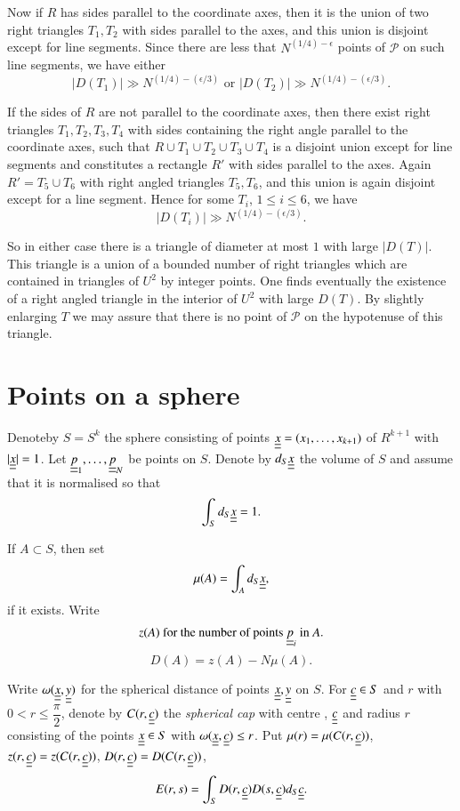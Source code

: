 Now if $R$ has sides parallel to the coordinate axes, then it is the union of two right triangles $T_{1}, T_{2}$ with sides parallel to the axes, and this union is disjoint except for line segments. Since there are less that $N^{(1/4)-\epsilon}$ points of $\mathscr{P}$ on such line segments, we have either
$$
|D(T_{1})| \gg N^{(1/4)-(\epsilon/3)} \text{ or } |D(T_{2})| \gg N^{(1/4)-(\epsilon/3)}.
$$

If the sides of $R$ are not parallel to the coordinate axes, then there exist right triangles $T_{1}, T_{2}, T_{3}, T_{4}$ with sides containing the right angle parallel to the coordinate axes, such that $R \cup T_{1} \cup T_{2} \cup T_{3} \cup T_{4}$ is a disjoint union except for line segments and constitutes a rectangle $R'$ with sides parallel to the axes. Again $R' = T_{5} \cup T_{6}$ with right angled triangles $T_{5}, T_{6}$, and this union is again disjoint except for a line segment. Hence for some $T_{i}$, $1 \leq i \leq 6$, we have
$$
|D(T_{i})| \gg N^{(1/4)-(\epsilon/3)}.
$$

So in either case there is a triangle of diameter at most $1$ with large $|D(T)|$. This triangle is a union of a bounded number of right triangles which are contained in triangles of $U^{2}$ by integer points. One finds eventually the existence of a right angled triangle in the interior of $U^{2}$ with large $D(T)$. By slightly enlarging $T$ we may assure that there is no point of $\mathscr{P}$ on the hypotenuse of this triangle.

\section{Points on a sphere}\label{chap2:sec10}

Denote\pageoriginale by $S = S^{k}$ the sphere consisting of points $\underline{\underline{x}} = (x_{1}, \ldots, x_{k+1})$ of $R^{k+1}$ with $|\underline{\underline{x}}| = 1$. Let $\underline{\underline{p}}_{1}, \ldots, \underline{\underline{p}}_{N}$ be points on $S$. Denote by $d_{S} \underline{\underline{x}}$ the volume of $S$ and assume that it is normalised so that
$$
\int_{S} d_{S} \underline{\underline{x}} = 1.
$$

If $A \subset S$, then set
$$
\mu(A) = \int_{A} d_{S} \underline{\underline{x}},
$$
if it exists. Write
$$
z(A) \text{ for the number of points } \underline{\underline{p}}_{i} \text{ in } A.
$$
$$
D(A) = z(A) - N\mu(A).
$$

Write $\omega(\underline{\underline{x}}, \underline{\underline{y}})$ for the spherical distance of points $\underline{\underline{x}}, \underline{\underline{y}}$ on $S$. For $\underline{\underline{c}} \in S$ and $r$ with $0 < r \leq \dfrac{\pi}{2}$, denote by $C(r, \underline{\underline{c}})$ the {\em spherical cap} with centre , $\underline{\underline{c}}$ and radius $r$ consisting of the points $\underline{\underline{x}} \in S$ with $\omega (\underline{\underline{x}}, \underline{\underline{c}}) \leq r$. Put $\mu(r) = \mu(C(r, \underline{\underline{c}}))$, $z(r, \underline{\underline{c}}) = z(C(r, \underline{\underline{c}}))$, $D(r, \underline{\underline{c}}) = D(C(r, \underline{\underline{c}}))$,
$$
E(r, s) = \int_{S} D(r, \underline{\underline{c}}) D(s, \underline{\underline{c}}) d_{S} \underline{\underline{c}}.
$$

